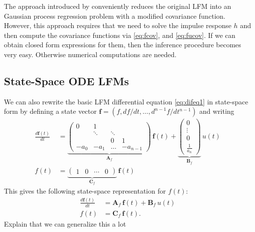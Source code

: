 \documentclass[journal]{IEEEtran}
\newcommand{\simo}[1]{{\color{red}#1}}
\begin{document}
The approach introduced by
\cite{Alvarez+Luengo+Lawrence:2009,Alvarez+Luengo+Lawrence:2013} conveniently
reduces the original LFM into an Gaussian process regression problem
with a modified covariance function. However, this approach requires
that we need to solve the impulse response $h$ and then compute the
covariance functions via \eqref{eq:fcov}, and \eqref{eq:fucov}.  If we can obtain closed form
expressions for them, then the inference procedure becomes very
easy. Otherwise numerical computations are needed.


\subsection{State-Space ODE LFMs}
%
We can also rewrite the basic LFM differential equation \eqref{eq:difeq1} in state-space form by defining a state vector $\mathbf{f} = (f, df/dt,\ldots,d^{n-1}f/dt^{n-1})$ and writing
%
\begin{equation}
\begin{split}
  \frac{d\mathbf{f}(t)}{dt}
  &= \underbrace{\begin{pmatrix}
       0             & 1      &        &       \\
                     & \ddots & \ddots &       \\
                     &         &  0    &     1 \\
   -a_0 & -a_1 & \hdots &  -a_{n-1}
  \end{pmatrix}}_{\mathbf{A}_f} \, \mathbf{f}(t)
  + \underbrace{\begin{pmatrix}
      0 \\
      \vdots \\
      0 \\
      \frac{1}{a_n}
  \end{pmatrix}}_{\mathbf{B}_f} \,
   u(t) \\
   f(t) &= \underbrace{\begin{pmatrix}
     1 & 0 & \cdots & 0
   \end{pmatrix}}_{\mathbf{C}_f} \, \mathbf{f}(t)
\end{split}
\label{eq:ss1}
\end{equation}
%
This gives the following state-space representation for $f(t)$:
%
\begin{equation}
\begin{split}
  \frac{d\mathbf{f}(t)}{dt}
  &= \mathbf{A}_f \, \mathbf{f}(t) + \mathbf{B}_f \, u(t) \\
  f(t) &= \mathbf{C}_f \, \mathbf{f}(t).
\end{split}
\label{eq:ssgen}
\end{equation}
%
\simo{Explain that we can generalize this a lot}
\end{document}
